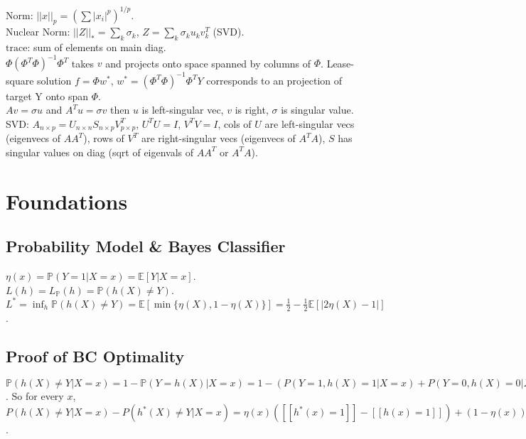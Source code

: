 Norm: $||x||_p = (\sum |x_i|^p)^{1/p}$.\\
Nuclear Norm: $||Z||_* = \sum_k\sigma_k$, $Z = \sum_k \sigma_k u_k v_k^T$ (SVD).\\
$\text{trace}$: sum of elements on main diag.\\
$\Phi(\Phi^T \Phi)^{-1}\Phi^T$ takes $v$ and projects onto space spanned by columns of $\Phi$. Lease-square solution $f=\Phi w^*$, $w^*=(\Phi^T \Phi)^{-1}\Phi^T Y$ corresponds to an projection of target Y onto span $\Phi$.\\
$Av=\sigma u$ and $A^Tu=\sigma v$ then $u$ is left-singular vec, $v$ is right, $\sigma$ is singular value.\\
SVD: $A_{n\times p} = U_{n\times n}S_{n\times p}V_{p\times p}^T$, $U^TU = I$, $V^TV = I$, cols of $U$ are left-singular vecs (eigenvecs of $AA^T$), rows of $V^T$ are right-singular vecs (eigenvecs of $A^TA$), $S$ has singular values on diag (sqrt of eigenvals of $AA^T$ or $A^TA$).

\section{Foundations}

\subsection*{Probability Model \& Bayes Classifier}

$\eta(x) = \mathbb{P}(Y=1|X=x) = \mathbb{E}[Y|X=x]$.\\
$L(h) = L_{\mathbb{P}}(h) = \mathbb{P}(h(X)\neq Y)$.\\
$L^* = \inf_h \mathbb{P}(h(X) \neq Y) = \mathbb{E}[\min\{\eta(X), 1-\eta(X)\}] = \frac{1}{2} - \frac{1}{2}\mathbb{E}[|2\eta(X) - 1|]$.

\subsection*{Proof of BC Optimality}

\begin{mdframed}
$\mathbb{P}(h(X) \neq Y | X = x) = 1 - \mathbb{P}(Y = h(X)|X=x) = 1 - (P(Y=1,h(X)=1|X=x) + P(Y=0,h(X)=0|X=x)) = 1 - ([[h(x)=1]]P(Y=1|X=x) + [[h(x)=0]]P(Y=0|X=x)) = 1 - ([[h(x)=1]]\eta(x) + [[h(x)=0]](1-\eta(x)))$. So for every $x$, $P(h(X) \neq Y|X=x) - P(h^*(X) \neq Y | X=x) = \eta(x)([[h^*(x)=1]] - [[h(x)=1]]) + (1-\eta(x))([[h^*(x)=0]]-[[h(x)=0]]) = (2\eta(x) - 1)([[h^*(x)=1]]-[[h(x)=1]]) \geq 0$.
\end{mdframed}

